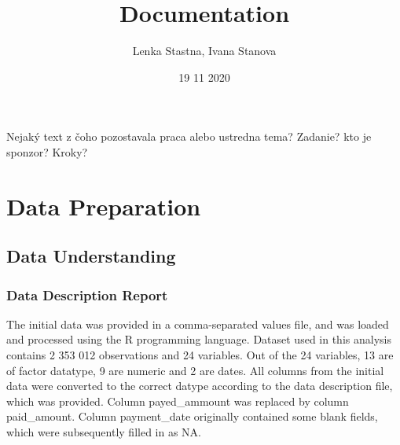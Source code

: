 \documentclass[
]{article}
\title{Documentation}
\author{Lenka Stastna, Ivana Stanova}
\date{19 11 2020}
\begin{document}
\maketitle

{
\setcounter{tocdepth}{2}
\tableofcontents
}
Nejaký text z čoho pozostavala praca alebo ustredna tema? Zadanie? kto je sponzor? Kroky?

\hypertarget{data-preparation}{%
\section{Data Preparation}\label{data-preparation}}

\hypertarget{data-understanding}{%
\subsection{Data Understanding}\label{data-understanding}}

\hypertarget{data-description-report}{%
\subsubsection{Data Description Report}\label{data-description-report}}

The initial data was provided in a comma-separated values file, and was loaded and processed using the R programming language. Dataset used in this analysis contains 2 353 012 observations and 24 variables. Out of the 24 variables, 13 are of factor datatype, 9 are numeric and 2 are dates.
All columns from the initial data were converted to the correct datype according to the data description file, which was provided. Column payed\_ammount was replaced by column paid\_amount. Column payment\_date originally contained some blank fields, which were subsequently filled in as NA.
\end{document}
